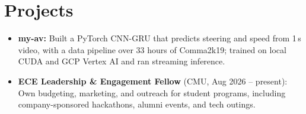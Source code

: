 \documentclass[11pt, letterpaper]{article}
\begin{document}
\section{Projects}
\begin{itemize}
  \item \textbf{my-av:} Built a PyTorch CNN-GRU that predicts steering and speed from 1\,s video, with a data pipeline over 33 hours of Comma2k19; trained on local CUDA and GCP Vertex AI and ran streaming inference.
  \item \textbf{ECE Leadership \& Engagement Fellow} (CMU, Aug 2026 -- present): Own budgeting, marketing, and outreach for student programs, including company-sponsored hackathons, alumni events, and tech outings.
\end{itemize}
\end{document}
